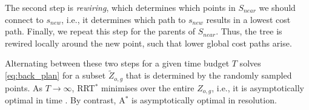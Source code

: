 \documentclass[letterpaper, 10 pt, conference]{ieeeconf}
\begin{document}
The second step is \emph{rewiring}, which determines which points in $S_{near}$ we should connect to $s_{new}$, i.e., it determines which path to $s_{new}$ results in a lowest cost path. Finally, we repeat this step for the parents of $S_{near}$. Thus, the tree is rewired locally around the new point, such that lower global cost paths arise.

Alternating between these two steps for a given time budget $T$ solves \eqref{eq:back_plan} for a subset $\tilde{Z}_{o,g}$ that is determined by the randomly sampled points. As $T \rightarrow \infty$, RRT$^*$ minimises over the entire $Z_{o,g}$, i.e., it is asymptotically optimal in time \cite{karaman2011sampling}. By contrast, A$^*$ is asymptotically optimal in resolution.






\end{document}
